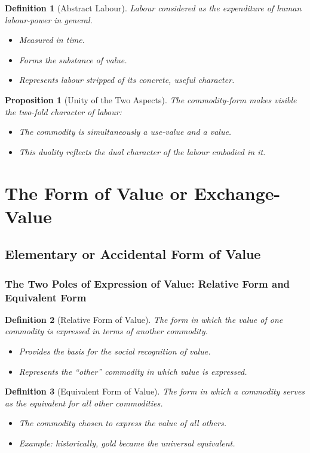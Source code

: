 \documentclass{article}
\newtheorem{definition}{Definition}[section]
\newtheorem{proposition}{Proposition}[section]
\begin{document}
\begin{definition}[Abstract Labour]\label{def:1.1.2.2}
Labour considered as the expenditure of human labour-power in general.
\begin{itemize}[noitemsep]
  \item Measured in time.
  \item Forms the substance of value.
  \item Represents labour stripped of its concrete, useful character.
\end{itemize}
\end{definition}

\begin{proposition}[Unity of the Two Aspects]\label{prop:1.1.2.2}
The commodity-form makes visible the two-fold character of labour:
\begin{itemize}[noitemsep]
  \item The commodity is simultaneously a use-value and a value.
  \item This duality reflects the dual character of the labour embodied in it.
\end{itemize}
\end{proposition}

\newpage

\section{The Form of Value or Exchange-Value}

\subsection{Elementary or Accidental Form of Value}

\subsubsection{The Two Poles of Expression of Value: Relative Form and Equivalent Form}

\begin{definition}[Relative Form of Value]
The form in which the value of one commodity is expressed in terms of another commodity.
\begin{itemize}[noitemsep]
    \item Provides the basis for the social recognition of value.
    \item Represents the “other” commodity in which value is expressed.
\end{itemize}
\end{definition}

\begin{definition}[Equivalent Form of Value]
The form in which a commodity serves as the equivalent for all other commodities.
\begin{itemize}[noitemsep]
    \item The commodity chosen to express the value of all others.
    \item Example: historically, gold became the universal equivalent.
\end{itemize}
\end{definition}
\end{document}
